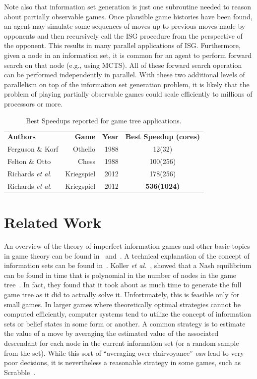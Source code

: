 \documentclass[10pt, conference, compsocconf]{IEEEtran}
\newcommand{\etal}{{\em et al.}\ }
\begin{document}
Note also that information set generation is just one subroutine needed to
reason about partially observable games.  Once plausible game histories have
been found, an agent may simulate some sequences of moves up to previous moves
made by opponents and then recursively call the ISG procedure from the
perspective of the opponent.  This results in many parallel applications of
ISG. Furthermore, given a node in an information set, it is common for an agent
to perform forward search on that node (e.g., using MCTS).  All of these
forward search operation can be performed independently in parallel. With these
two additional levels of parallelism on top of the information set generation
problem, it is likely that the problem of playing partially observable
games could scale efficiently to millions of processors or more.
\begin{table}[ht]
\caption{Best Speedups reported for game tree applications.}
\centering
\begin{tabular}{lrrc}
{\bf Authors} & {\bf Game} & {\bf Year} & {\bf Best Speedup (cores)} \\
Ferguson \& Korf & Othello & 1988 & 12(32) \\
Felton \& Otto & Chess & 1988 & 100(256) \\
Richards \etal & Kriegspiel & 2012 & 178(256) \\
Richards \etal & Kriegspiel & 2012 & {\bf 536(1024)} \\
\end{tabular}
\label{bestspeedups}
\vspace{-0.2in} 
\end{table}
\section{Related Work}
\label{Related}
An overview of the theory of imperfect information games and other basic topics
in game theory can be found in~\cite{kuhn03lectures} and~\cite{kuhn97classics}.
A technical explanation of the concept of information sets can be found
in~\cite{gilpin09algorithms}.  Koller \etal, showed that a Nash equilibrium can
be found in time that is polynomial in the number of nodes in the game
tree~\cite{koller94fast}.  In fact, they found that it took about as much time
to generate the full game tree as it did to actually solve it.  Unfortunately,
this is feasible only for small games.  In larger games where theoretically
optimal strategies cannot be computed efficiently, computer systems tend to
utilize the concept of information sets or belief states in some form or
another.  A common strategy is to estimate the value of a move by averaging the
estimated value of the associated descendant for each node in the current
information set (or a random sample from the set).  While this sort of
``averaging over clairvoyance'' {\em can} lead to very poor decisions, it is
nevertheless a reasonable strategy in some games, such as
Scrabble~\cite{sheppard02world}.
\end{document}
